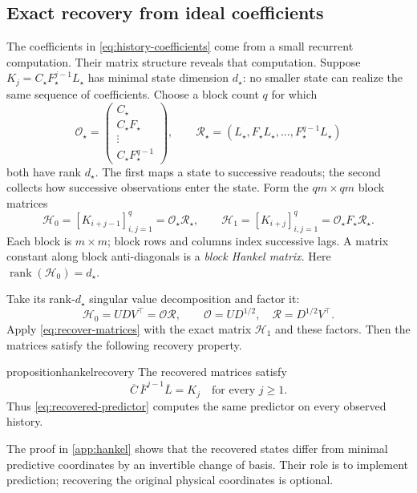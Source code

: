 \documentclass[11pt,twoside]{article}
\DeclareMathOperator{\rank}{rank}
\theoremstyle{definition}
\theoremstyle{remark}
\begin{document}
\subsection{Exact recovery from ideal coefficients}
\label{sec:exact-realization}

The coefficients in \cref{eq:history-coefficients} come from a small
recurrent computation. Their matrix structure reveals that computation.
Suppose \(K_j=C_\star F_\star^{j-1}L_\star\) has minimal state
dimension \(d_\star\): no smaller state can realize the same sequence
of coefficients. Choose a block count \(q\) for which
\[
 \mathcal O_\star=
 \begin{pmatrix}C_\star\\C_\star F_\star\\\vdots\\C_\star F_\star^{q-1}\end{pmatrix},
 \qquad
 \mathcal R_\star=
 (L_\star,F_\star L_\star,\ldots,F_\star^{q-1}L_\star)
\]
both have rank \(d_\star\). The first maps a state to successive
readouts; the second collects how successive observations enter the state.
Form the \(qm\times qm\) block matrices
\begin{equation}
 \mathcal H_0=[K_{i+j-1}]_{i,j=1}^q
   =\mathcal O_\star\mathcal R_\star,\qquad
 \mathcal H_1=[K_{i+j}]_{i,j=1}^q
   =\mathcal O_\star F_\star\mathcal R_\star.
 \label{eq:hankel-factorization}
\end{equation}
Each block is \(m\times m\); block rows and columns index successive
lags. A matrix constant along block anti-diagonals is a
\emph{block Hankel matrix}. Here \(\rank(\mathcal H_0)=d_\star\).

Take its rank-\(d_\star\) singular value decomposition and factor it:
\[
 \mathcal H_0=UDV^\top=\mathcal O\mathcal R,\qquad
 \mathcal O=UD^{1/2},\quad\mathcal R=D^{1/2}V^\top.
\]
Apply \cref{eq:recover-matrices} with the exact matrix
\(\mathcal H_1\) and these factors. Then the matrices satisfy the following
recovery property.

\begin{restatable}{proposition}{hankelrecovery}
\label{prop:hankel-recovery}
The recovered matrices satisfy
\[
 \overline C\,\overline F^{j-1}\overline L=K_j
 \quad\text{for every }j\ge1.
\]
Thus \cref{eq:recovered-predictor} computes the same predictor
on every observed history.
\end{restatable}

The proof in \cref{app:hankel} shows that the recovered states differ
from minimal predictive coordinates by an invertible change of basis.
Their role is to implement prediction; recovering the original physical
coordinates is optional.
\end{document}
